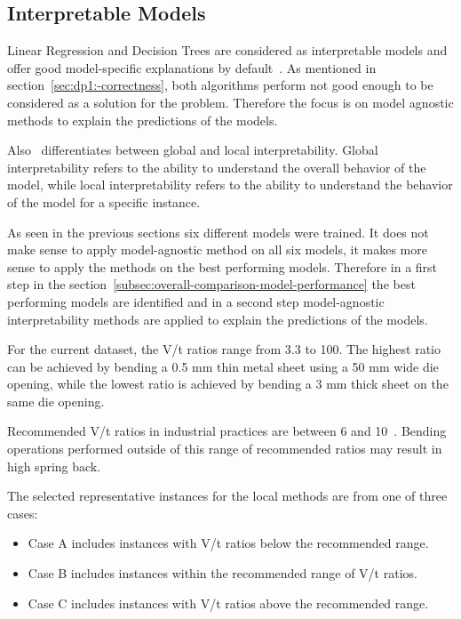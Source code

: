 %

\subsection{Interpretable Models}\label{subsec:interpretable-models}
Linear Regression and Decision Trees are considered as interpretable models and offer good
model-specific explanations by default~\cite{molnar2020interpretable}.
As mentioned in section~\ref{sec:dp1:-correctness}, both algorithms perform not good enough
to be considered as a solution for the problem.
Therefore the focus is on model agnostic methods to explain the predictions of the models.

Also~\cite{molnar2020interpretable} differentiates between global and local
interpretability. Global
interpretability refers to the ability to understand the overall behavior of
the model, while local interpretability refers to the ability to understand the behavior of the
model for a specific instance.

As seen in the previous sections six different models were trained.
It does not make sense to apply model-agnostic method on all six models, it makes more sense to
apply the methods on the best performing models.
Therefore in a first step in the section~\ref{subsec:overall-comparison-model-performance} the
best performing models
are identified and in a second step model-agnostic interpretability methods are applied to
explain the predictions of the models.

For the current dataset, the V/t ratios range from 3.3 to 100. The highest ratio can be achieved
by bending a 0.5 mm thin metal sheet using a 50 mm wide die opening, while the lowest ratio is
achieved by bending a 3 mm thick sheet on the same die opening.

Recommended V/t ratios in industrial practices are between 6 and 10~\cite[p.7]{
    cruz_applicationmachinelearning_2021}.
Bending operations performed outside of this range of recommended ratios may result in
high spring back.

The selected representative instances for the local methods are from one of three cases:
\begin{itemize}
    \item Case A includes instances with V/t ratios below the recommended range.
    \item Case B includes instances within the recommended range of V/t ratios.
    \item Case C includes instances with V/t ratios above the recommended range.
\end{itemize}

